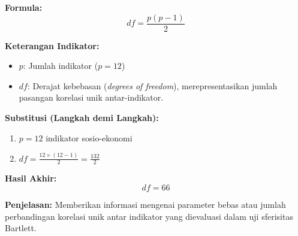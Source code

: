 \documentclass[11pt,a4paper]{article}
\begin{document}
\begin{tcolorbox}[formula_box, title={Derajat Kebebasan Uji Bartlett ($df$)}] \label{kotak:df}
\textbf{Formula:}
\[ df = \frac{p(p-1)}{2} \]

\textbf{Keterangan Indikator:}
\begin{itemize}
  \item $p$: Jumlah indikator ($p=12$)
  \item $df$: Derajat kebebasan (\textit{degrees of freedom}), merepresentasikan jumlah pasangan korelasi unik antar-indikator.
\end{itemize}

\textbf{Substitusi (Langkah demi Langkah):}
\begin{enumerate}
  \item $p = 12$ indikator sosio-ekonomi
  \item $df = \frac{12 \times (12-1)}{2} = \frac{132}{2}$
\end{enumerate}

\textbf{Hasil Akhir:}
\[ df = 66 \]

\textbf{Penjelasan:} Memberikan informasi mengenai parameter bebas atau jumlah perbandingan korelasi unik antar indikator yang dievaluasi dalam uji sferisitas Bartlett.
\end{tcolorbox}
\end{document}
